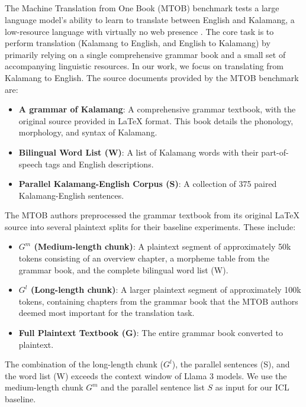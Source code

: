 \subsection{\mtob}
The Machine Translation from One Book (MTOB) benchmark tests a large language model's ability to learn to translate between English and Kalamang, a low-resource language with virtually no web presence \cite{tanzer2023benchmark}. The core task is to perform translation (Kalamang to English, and English to Kalamang) by primarily relying on a single comprehensive grammar book and a small set of accompanying linguistic resources. In our work, we focus on translating from Kalamang to English.
The source documents provided by the MTOB benchmark are:
\begin{itemize}[leftmargin=*]
    \item \textbf{A grammar of Kalamang}: A comprehensive grammar textbook, with the original source provided in \LaTeX{} format. This book details the phonology, morphology, and syntax of Kalamang.
    \item \textbf{Bilingual Word List (W)}: A list of Kalamang words with their part-of-speech tags and English descriptions.
    \item \textbf{Parallel Kalamang-English Corpus (S)}: A collection of 375 paired Kalamang-English sentences.
\end{itemize}
The MTOB authors preprocessed the grammar textbook from its original \LaTeX{} source into several plaintext splits for their baseline experiments. These include:
\begin{itemize}[leftmargin=*]
    \item \textbf{$G^m$ (Medium-length chunk)}: A plaintext segment of approximately 50k tokens consisting of an overview chapter, a morpheme table from the grammar book, and the complete bilingual word list (W).
    \item \textbf{$G^l$ (Long-length chunk)}: A larger plaintext segment of approximately 100k tokens, containing chapters from the grammar book that the MTOB authors deemed most important for the translation task.
    \item \textbf{Full Plaintext Textbook (G)}: The entire grammar book converted to plaintext.
\end{itemize}
The combination of the long-length chunk ($G^l$), the parallel sentences (S), and the word list (W) exceeds the context window of Llama 3 models. We use the medium-length chunk $G^m$ and the parallel sentence list $S$ as input for our ICL baseline.
